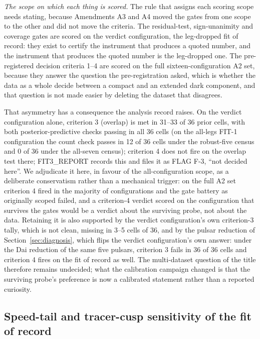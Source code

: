 \documentclass[11pt]{article}
\begin{document}
\emph{The scope on which each thing is scored.} The rule that assigns each scoring scope needs stating, because Amendments A3 and A4 moved the gates from one scope to the other and did not move the criteria. The residual-test, sign-unanimity and coverage gates are scored on the verdict configuration, the leg-dropped fit of record: they exist to certify the instrument that produces a quoted number, and the instrument that produces the quoted number is the leg-dropped one. The pre-registered decision criteria 1--4 are scored on the full sixteen-configuration A2 set, because they answer the question the pre-registration asked, which is whether the data as a whole decide between a compact and an extended dark component, and that question is not made easier by deleting the dataset that disagrees.

That asymmetry has a consequence the analysis record raises. On the verdict configuration alone, criterion 3 (overlap) is met in 31--33 of 36 prior cells, with both posterior-predictive checks passing in all 36 cells (on the all-legs FIT-1 configuration the count check passes in 12 of 36 cells under the robust-five census and 0 of 36 under the all-seven census); criterion 4 does not fire on the overlap test there; FIT3\_REPORT records this and files it as FLAG F-3, ``not decided here''. We adjudicate it here, in favour of the all-configuration scope, as a deliberate conservatism rather than a mechanical trigger: on the full A2 set criterion 4 fired in the majority of configurations and the gate battery as originally scoped failed, and a criterion-4 verdict scored on the configuration that survives the gates would be a verdict about the surviving probe, not about the data. Retaining it is also supported by the verdict configuration's own criterion-3 tally, which is not clean, missing in 3--5 cells of 36, and by the pulsar reduction of Section~\ref{sec:diagnosis}, which flips the verdict configuration's own answer: under the Dai reduction of the same five pulsars, criterion 3 fails in 36 of 36 cells and criterion 4 fires on the fit of record as well. The multi-dataset question of the title therefore remains undecided; what the calibration campaign changed is that the surviving probe's preference is now a calibrated statement rather than a reported curiosity.


\subsection{Speed-tail and tracer-cusp sensitivity of the fit of record}
\label{sec:tailsens}
\end{document}
